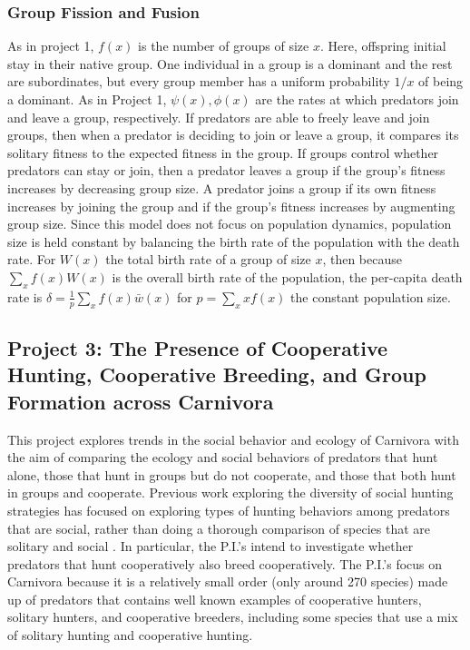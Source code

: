 \subsubsection{Group Fission and Fusion}
As in project 1, $f(x)$ is the number of groups of size $x$. Here, offspring initial stay in their native group. One individual in a group is a dominant and the rest are subordinates, but every group member has a uniform probability $1/x$ of being a dominant. As in Project 1, $\psi(x), \phi(x)$ are the rates at which predators join and leave a group, respectively. If predators are able to freely leave and join groups, then when a predator is deciding to join or leave a group, it compares its solitary fitness to the expected fitness in the group. If groups control whether predators can stay or join, then a predator leaves a group if the group's fitness increases by decreasing group size. A predator joins a group if its own fitness increases by joining the group and if the group's fitness increases by augmenting group size. Since this model does not focus on population dynamics, population size is held constant by balancing the birth rate of the population with the death rate. For $W(x)$ the total birth rate of a group of size $x$, then because $\sum_x f(x) W(x)$ is the overall birth rate of the population, the per-capita death rate is $\delta = \frac{1}{p} \sum_x f(x) \bar{w}(x)$ for $p = \sum_x x f(x)$ the constant population size.


\subsection{Project 3: The Presence of Cooperative Hunting, Cooperative Breeding, and Group Formation across Carnivora}
This project explores trends in the social behavior and ecology of Carnivora with the aim of comparing the ecology and social behaviors of predators that hunt alone, those that hunt in groups but do not cooperate, and those that both hunt in groups and cooperate. Previous work exploring the diversity of social hunting strategies has focused on exploring types of hunting behaviors among predators that are social, rather than doing a thorough comparison of species that are solitary and social \cite{hansen_mechanisms_2023, lang_multidimensional_2017, bailey_group_2013}. In particular, the P.I.'s intend to investigate whether predators that hunt cooperatively also breed cooperatively. The P.I.'s focus on Carnivora because it is a relatively small order (only around 270 species) made up of predators that contains well known examples of cooperative hunters, solitary hunters, and cooperative breeders, including some species that use a mix of solitary hunting and cooperative hunting.

